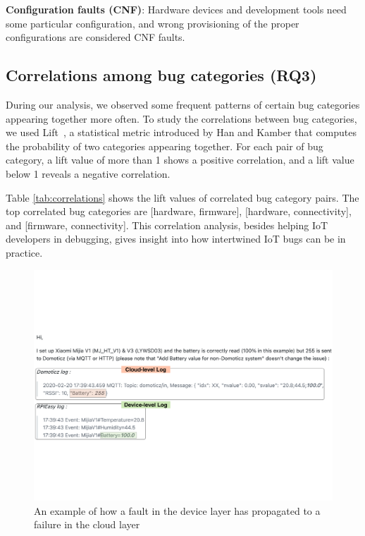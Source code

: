 \textbf{Configuration faults (CNF)}: Hardware devices and development tools need some particular configuration, and wrong provisioning of the proper configurations are considered CNF faults.


\subsection{Correlations among bug categories (RQ3)}
During our analysis, we observed some frequent patterns of certain bug categories appearing together more often. To study the correlations between bug categories, we used Lift~\cite{kamber2001data}, a statistical metric introduced by Han and Kamber that computes the probability of two categories appearing together. For each pair of bug category, a lift value of more than 1 shows a positive correlation, and a lift value below 1 reveals a negative correlation. 

Table \ref{tab:correlations} shows the lift values of correlated bug category pairs. The top correlated bug categories are [hardware, firmware], [hardware, connectivity], and [firmware, connectivity]. This correlation analysis, besides helping IoT developers in debugging, gives insight into how intertwined IoT bugs can be in practice.


 \begin{figure}%
  \centering
   \includegraphics[width=\linewidth]{imgs/corEx}
  \caption{An example of how a fault in the device layer has propagated to a failure in the cloud layer}
  \label{fig:corEx}
\end{figure}


